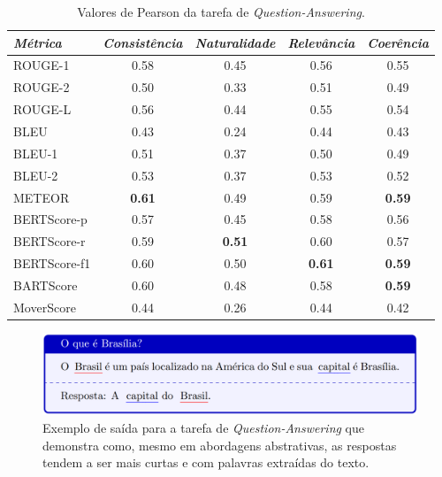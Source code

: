 \documentclass[cic,tc]{iiufrgs}
\begin{document}
\begin{table}[htbp]
    \caption{Valores de Pearson da tarefa de \textit{Question-Answering}.}
    \centering
        \begin{tabular}{l c c c c}
          \hline
          \textit{Métrica} & \textit{Consistência} & \textit{Naturalidade} & \textit{Relevância} & \textit{Coerência} \\
          \hline
          \hline
          ROUGE-1 & 0.58 & 0.45 & 0.56 & 0.55\\
          ROUGE-2 & 0.50 & 0.33 & 0.51 & 0.49\\
          ROUGE-L & 0.56 & 0.44 & 0.55 & 0.54\\
          BLEU    & 0.43 & 0.24 & 0.44 & 0.43\\
          BLEU-1  & 0.51 & 0.37 & 0.50 & 0.49\\
          BLEU-2  & 0.53 & 0.37 & 0.53 & 0.52\\
          METEOR  & \textbf{0.61} & 0.49 & 0.59 & \textbf{0.59}\\
          \hline
          BERTScore-p  & 0.57 & 0.45 & 0.58 & 0.56\\
          BERTScore-r  & 0.59 & \textbf{0.51} & 0.60 & 0.57\\
          BERTScore-f1 & 0.60 & 0.50 & \textbf{0.61} & \textbf{0.59}\\
          BARTScore    & 0.60 & 0.48 & 0.58 & \textbf{0.59}\\
          MoverScore   & 0.44 & 0.26 & 0.44 & 0.42\\
          \hline
        \end{tabular}
    \label{tbl:resultados-qa}
\end{table}

\begin{figure}[htbp]
    \caption{Exemplo de saída para a tarefa de \textit{Question-Answering} que demonstra como, mesmo em abordagens abstrativas, as respostas tendem a ser mais curtas e com palavras extraídas do texto.}
    \begin{center}
    \includegraphics[width=\textwidth]{Figures/qa-2.png}
    \end{center}
    \label{fig:qa-exemplo}
\end{figure}
\end{document}
